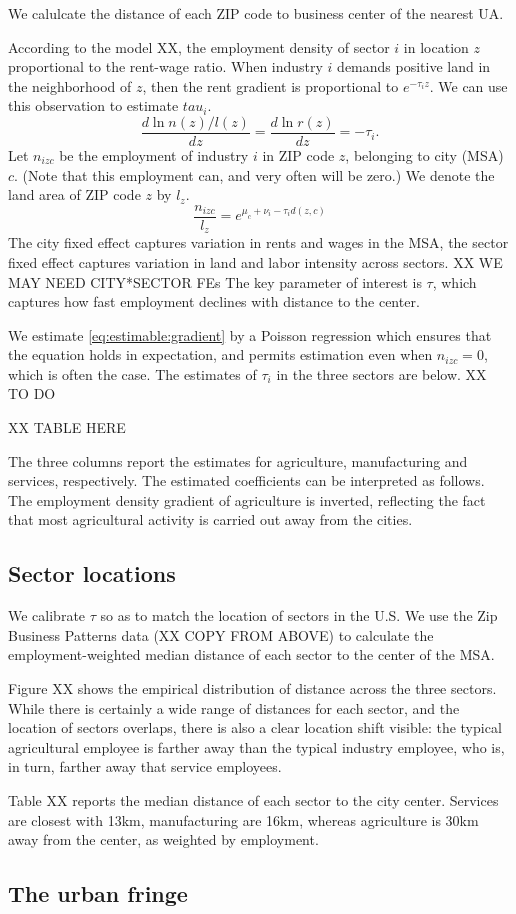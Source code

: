 \documentclass[12pt]{article}
\begin{document}
We calulcate the distance of each ZIP code to business center of the nearest UA.

According to the model XX, the employment density of sector $i$ in location $z$ proportional to the rent-wage ratio. When industry $i$ demands positive land in the neighborhood of $z$, then the rent gradient is proportional to $e^{-\tau_iz}$. We can use this observation to estimate $tau_i$.
\[
\frac{d\ln n(z)/l(z)}{dz} =\frac{d\ln r(z)}{dz} = -\tau_i.
\]
Let $n_{izc}$ be the employment of industry $i$ in ZIP code $z$, belonging to city (MSA) $c$. (Note that this employment can, and very often will be zero.) We denote the land area of ZIP code $z$ by $l_z$.
\begin{equation}\label{eq:estimable:gradient}
\frac{n_{izc}}{l_z} = e^{\mu_c+\nu_i-\tau_i d(z,c)}
\end{equation}
The city fixed effect captures variation in rents and wages in the MSA, the sector fixed effect captures variation in land and labor intensity across sectors. XX WE MAY NEED CITY*SECTOR FEs The key parameter of interest is $\tau$, which captures how fast employment declines with distance to the center.

We estimate \eqref{eq:estimable:gradient} by a Poisson regression which ensures that the equation holds in expectation, and permits estimation even when $n_{izc}=0$, which is often the case. The estimates of $\tau_i$ in the three sectors are below. XX TO DO

XX TABLE HERE

The three columns report the estimates for agriculture, manufacturing and services, respectively. The estimated coefficients can be interpreted as follows. The employment density gradient of agriculture is inverted, reflecting the fact that most agricultural activity is carried out away from the cities.

\subsection{Sector locations}
We calibrate $\tau$ so as to match the location of sectors in the U.S. We use the Zip Business Patterns data (XX COPY FROM ABOVE) to calculate the employment-weighted median distance of each sector to the center of the MSA.

Figure XX shows the empirical distribution of distance across the three sectors. While there is certainly a wide range of distances for each sector, and the location of sectors overlaps, there is also a clear location shift visible: the typical agricultural employee is farther away than the typical industry employee, who is, in turn, farther away that service employees.

Table XX reports the median distance of each sector to the city center. Services are closest with 13km, manufacturing are 16km, whereas agriculture is 30km away from the center, as weighted by employment.

\subsection{The urban fringe}
\end{document}
